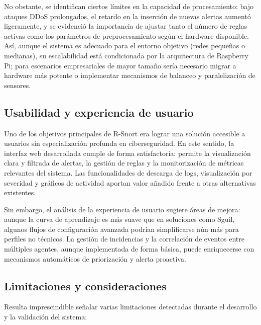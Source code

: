 \documentclass[11pt,a4paper,twoside]{report}
\begin{document}
No obstante, se identifican ciertos límites en la capacidad de procesamiento: bajo ataques DDoS prolongados, el retardo en la inserción de nuevas alertas aumentó ligeramente, y se evidenció la importancia de ajustar tanto el número de reglas activas como los parámetros de preprocesamiento según el hardware disponible. Así, aunque el sistema es adecuado para el entorno objetivo (redes pequeñas o medianas), su escalabilidad está condicionada por la arquitectura de Raspberry Pi; para escenarios empresariales de mayor tamaño sería necesario migrar a hardware más potente o implementar mecanismos de balanceo y paralelización de sensores.

\subsection{Usabilidad y experiencia de usuario}

Uno de los objetivos principales de R-Snort era lograr una solución accesible a usuarios sin especialización profunda en ciberseguridad. En este sentido, la interfaz web desarrollada cumple de forma satisfactoria: permite la visualización clara y filtrada de alertas, la gestión de reglas y la monitorización de métricas relevantes del sistema. Las funcionalidades de descarga de logs, visualización por severidad y gráficos de actividad aportan valor añadido frente a otras alternativas existentes.\newline

Sin embargo, el análisis de la experiencia de usuario sugiere áreas de mejora: aunque la curva de aprendizaje es más suave que en soluciones como Sguil, algunos flujos de configuración avanzada podrían simplificarse aún más para perfiles no técnicos. La gestión de incidencias y la correlación de eventos entre múltiples agentes, aunque implementada de forma básica, puede enriquecerse con mecanismos automáticos de priorización y alerta proactiva.

\subsection{Limitaciones y consideraciones}

Resulta imprescindible señalar varias limitaciones detectadas durante el desarrollo y la validación del sistema:
\end{document}
